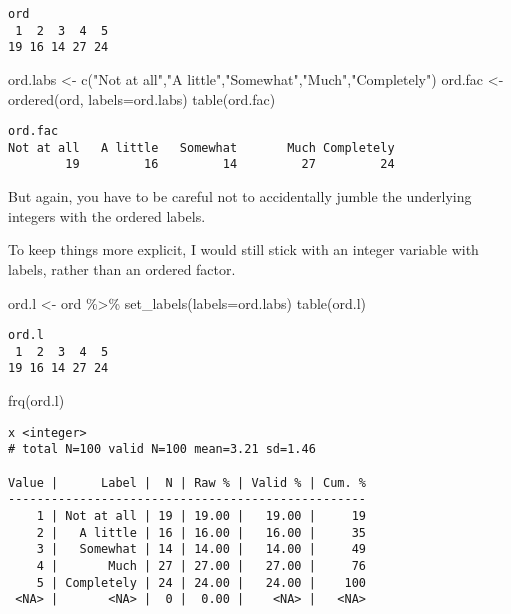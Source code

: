 \documentclass[
  letterpaper,
  DIV=11,
  numbers=noendperiod]{scrreprt}
\newenvironment{Shaded}{\begin{snugshade}}{\end{snugshade}}
\newcommand{\AttributeTok}[1]{\textcolor[rgb]{0.40,0.45,0.13}{#1}}
\newcommand{\FunctionTok}[1]{\textcolor[rgb]{0.28,0.35,0.67}{#1}}
\newcommand{\NormalTok}[1]{\textcolor[rgb]{0.00,0.23,0.31}{#1}}
\newcommand{\OtherTok}[1]{\textcolor[rgb]{0.00,0.23,0.31}{#1}}
\newcommand{\SpecialCharTok}[1]{\textcolor[rgb]{0.37,0.37,0.37}{#1}}
\newcommand{\StringTok}[1]{\textcolor[rgb]{0.13,0.47,0.30}{#1}}
\begin{document}
\begin{verbatim}
ord
 1  2  3  4  5 
19 16 14 27 24 
\end{verbatim}

\begin{Shaded}
\begin{Highlighting}[]
\NormalTok{ord.labs }\OtherTok{\textless{}{-}} \FunctionTok{c}\NormalTok{(}\StringTok{"Not at all"}\NormalTok{,}\StringTok{"A little"}\NormalTok{,}\StringTok{"Somewhat"}\NormalTok{,}\StringTok{"Much"}\NormalTok{,}\StringTok{"Completely"}\NormalTok{)}
\NormalTok{ord.fac }\OtherTok{\textless{}{-}} \FunctionTok{ordered}\NormalTok{(ord, }\AttributeTok{labels=}\NormalTok{ord.labs)}
\FunctionTok{table}\NormalTok{(ord.fac)}
\end{Highlighting}
\end{Shaded}

\begin{verbatim}
ord.fac
Not at all   A little   Somewhat       Much Completely 
        19         16         14         27         24 
\end{verbatim}

But again, you have to be careful not to accidentally jumble the
underlying integers with the ordered labels.

To keep things more explicit, I would still stick with an integer
variable with labels, rather than an ordered factor.

\begin{Shaded}
\begin{Highlighting}[]
\NormalTok{ord.l }\OtherTok{\textless{}{-}}\NormalTok{ ord }\SpecialCharTok{\%\textgreater{}\%}
  \FunctionTok{set\_labels}\NormalTok{(}\AttributeTok{labels=}\NormalTok{ord.labs)}
\FunctionTok{table}\NormalTok{(ord.l)}
\end{Highlighting}
\end{Shaded}

\begin{verbatim}
ord.l
 1  2  3  4  5 
19 16 14 27 24 
\end{verbatim}

\begin{Shaded}
\begin{Highlighting}[]
\FunctionTok{frq}\NormalTok{(ord.l)}
\end{Highlighting}
\end{Shaded}

\begin{verbatim}
x <integer> 
# total N=100 valid N=100 mean=3.21 sd=1.46

Value |      Label |  N | Raw % | Valid % | Cum. %
--------------------------------------------------
    1 | Not at all | 19 | 19.00 |   19.00 |     19
    2 |   A little | 16 | 16.00 |   16.00 |     35
    3 |   Somewhat | 14 | 14.00 |   14.00 |     49
    4 |       Much | 27 | 27.00 |   27.00 |     76
    5 | Completely | 24 | 24.00 |   24.00 |    100
 <NA> |       <NA> |  0 |  0.00 |    <NA> |   <NA>
\end{verbatim}
\end{document}
